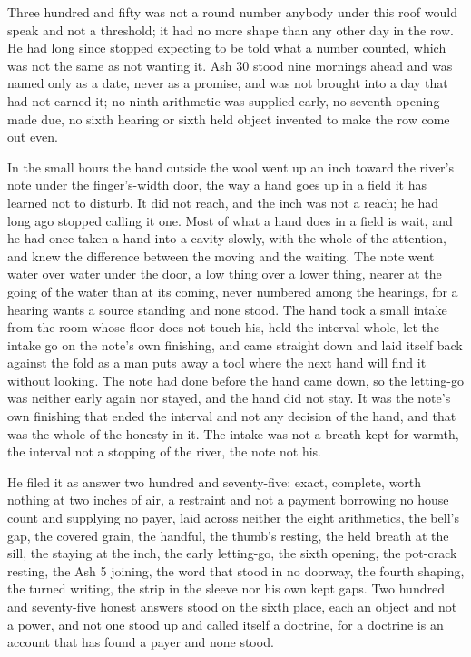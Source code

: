 Three hundred and fifty was not a round number anybody under this roof would speak and not a threshold; it had no more shape than any other day in the row. He had long since stopped expecting to be told what a number counted, which was not the same as not wanting it. Ash 30 stood nine mornings ahead and was named only as a date, never as a promise, and was not brought into a day that had not earned it; no ninth arithmetic was supplied early, no seventh opening made due, no sixth hearing or sixth held object invented to make the row come out even.

\scenebreak

In the small hours the hand outside the wool went up an inch toward the river's note under the finger's-width door, the way a hand goes up in a field it has learned not to disturb. It did not reach, and the inch was not a reach; he had long ago stopped calling it one. Most of what a hand does in a field is wait, and he had once taken a hand into a cavity slowly, with the whole of the attention, and knew the difference between the moving and the waiting. The note went water over water under the door, a low thing over a lower thing, nearer at the going of the water than at its coming, never numbered among the hearings, for a hearing wants a source standing and none stood. The hand took a small intake from the room whose floor does not touch his, held the interval whole, let the intake go on the note's own finishing, and came straight down and laid itself back against the fold as a man puts away a tool where the next hand will find it without looking. The note had done before the hand came down, so the letting-go was neither early again nor stayed, and the hand did not stay. It was the note's own finishing that ended the interval and not any decision of the hand, and that was the whole of the honesty in it. The intake was not a breath kept for warmth, the interval not a stopping of the river, the note not his.

He filed it as answer two hundred and seventy-five: exact, complete, worth nothing at two inches of air, a restraint and not a payment borrowing no house count and supplying no payer, laid across neither the eight arithmetics, the bell's gap, the covered grain, the handful, the thumb's resting, the held breath at the sill, the staying at the inch, the early letting-go, the sixth opening, the pot-crack resting, the Ash 5 joining, the word that stood in no doorway, the fourth shaping, the turned writing, the strip in the sleeve nor his own kept gaps. Two hundred and seventy-five honest answers stood on the sixth place, each an object and not a power, and not one stood up and called itself a doctrine, for a doctrine is an account that has found a payer and none stood.


